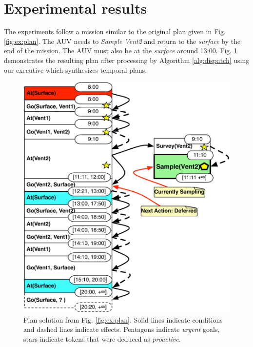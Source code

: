 \section{Experimental results}
\label{sec:exp}

The experiments follow a mission similar to the original plan given in
Fig. \ref{fig:ex:plan}. The AUV needs to {\em Sample Vent2} and return
to the {\em surface} by the end of the mission. The AUV must also be
at the {\em surface} around
13:00. %
Fig. \ref{fig:ex:mixed1} demonstrates the resulting plan after
processing by Algorithm \ref{alg:dispatch} using our executive \rx
which synthesizes temporal plans.

\begin{figure}[!htbp]
  \centering
  \includegraphics[width=0.8\columnwidth]{figs/example_MixedInitial}
  \caption{\small Plan solution from Fig. \ref{fig:ex:plan}. Solid
    lines indicate conditions and dashed lines indicate
    effects. Pentagons indicate {\em urgent} goals, stars indicate
    tokens that were deduced as {\em proactive}.}
  \label{fig:ex:mixed1}
\end{figure}



